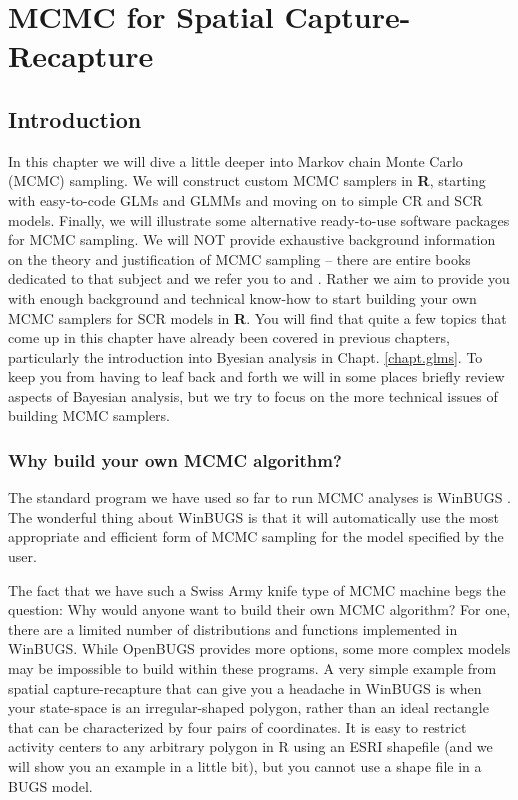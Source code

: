 \chapter{
MCMC for Spatial Capture-Recapture
}
\label{chapt.mcmc}


\vspace{.3in}

\section{Introduction}
In this chapter we will dive a little deeper into Markov chain Monte
Carlo (MCMC) sampling. We will construct custom MCMC samplers in {\bf R},
starting with easy-to-code GLMs and GLMMs and moving on to simple CR and SCR
models. Finally, we will illustrate some alternative
ready-to-use software packages for MCMC sampling. We will NOT provide
exhaustive background information on the theory and justification of
MCMC sampling – there are entire books dedicated to that subject and
we refer you to \citet{robert_casella:2004} and
\citet{robert_casella:2010}. Rather we aim to provide you with enough
background and technical know-how to start building your own MCMC
samplers for SCR models in {\bf R}. You will find that quite a few topics that come up 
in this chapter have already been covered in previous chapters, particularly the introduction
into Byesian analysis in Chapt. \ref{chapt.glms}. To keep you from having to leaf back and forth
we will in some places briefly review aspects of Bayesian analysis, but we try to focus on the more 
technical issues of building MCMC samplers. 



\subsection{Why build your own MCMC algorithm?}

The standard program we have used so far to run MCMC analyses is
WinBUGS \citep{gilks_etal:1994}. The wonderful thing about WinBUGS is
that it will automatically use the most appropriate and efficient form
of MCMC sampling for the model specified by the user.

The fact that we have such a Swiss Army knife type of MCMC machine
begs the question: Why would anyone want to build their own MCMC
algorithm? For one, there are a limited number of distributions and
functions implemented in WinBUGS. While OpenBUGS provides more
options, some more complex models may be impossible to build within
these programs. A very simple example from spatial capture-recapture
that can give you a headache in WinBUGS is when your state-space is an
irregular-shaped polygon, rather than an ideal rectangle that can be
characterized by four pairs of coordinates. It is easy to restrict
activity centers to any arbitrary polygon in R using an ESRI shapefile
(and we will show you an example in a little bit), but you cannot use
a shape file in a BUGS model.

